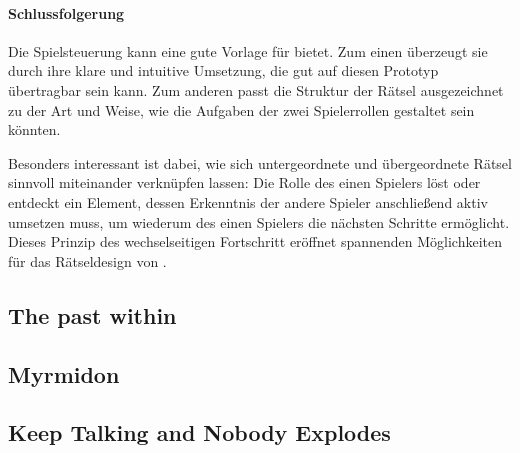 \paragraph{Schlussfolgerung}
Die Spielsteuerung kann eine gute Vorlage für  bietet. Zum einen überzeugt sie durch ihre klare und intuitive Umsetzung, die gut auf diesen Prototyp übertragbar sein kann. Zum anderen passt die Struktur der Rätsel ausgezeichnet zu der Art und Weise, wie die Aufgaben der zwei Spielerrollen gestaltet sein könnten.

Besonders interessant ist dabei, wie sich untergeordnete und übergeordnete Rätsel sinnvoll miteinander verknüpfen lassen: Die Rolle des einen Spielers löst oder entdeckt ein Element, dessen Erkenntnis der andere Spieler anschließend aktiv umsetzen muss, um wiederum des einen Spielers die nächsten Schritte ermöglicht. Dieses Prinzip des wechselseitigen Fortschritt eröffnet spannenden Möglichkeiten für das Rätseldesign von .

\subsection{The past within}

\subsection{Myrmidon}

\subsection{Keep Talking and Nobody Explodes}